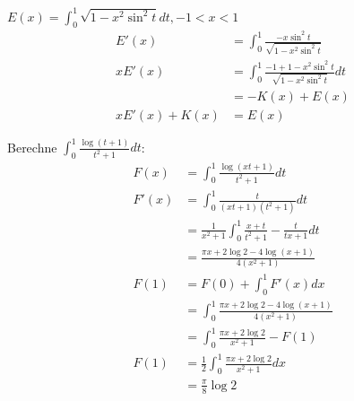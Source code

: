 \begin{example}
$E(x) = \int_0^1 \sqrt{1-x^2\sin^2t} dt, -1 < x < 1$
    \begin{align*}
        E'(x) &= \int_0^1\frac{-x \sin^2 t}{\sqrt{1-x^2\sin^2t}}\\
        x E'(x) &= \int_0^1\frac{-1+1-x^2 \sin^2 t}{\sqrt{1-x^2\sin^2t}}dt \\ &= -K(x) + E(x)\\
        xE'(x) + K(x) &= E(x)
    \end{align*}
\end{example}

\begin{example} Berechne $\int_0^1 \frac{\log(t+1)}{t^2 + 1} dt$:
\begin{align*}
    F(x) &= \int_0^1 \frac{\log(xt+1)}{t^2+1}dt\\
    F'(x) &= \int_0^1\frac{t}{(xt+1)(t^2+1)}dt\\
    &=\frac{1}{x^2+1}\int_0^1 \frac{x+t}{t^2+1}-\frac{t}{tx+1}dt\\
    &= \frac{\pi x + 2\log 2 - 4 \log(x+1)}{4(x^2+1)}\\
    F(1) &= F(0) + \int_0^1F'(x) dx \\
    &= \int_0^1 \frac{\pi x + 2\log 2 - 4 \log(x+1)}{4(x^2+1)}\\
    &=\int_0^1\frac{\pi x + 2\log 2}{x^2+1} - F(1)\\
    F(1) &= \frac{1}{2} \int_0^1 \frac{\pi x + 2\log 2}{x^2+1} dx \\
    &= \frac{\pi}{8}\log 2
\end{align*}
\end{example}

